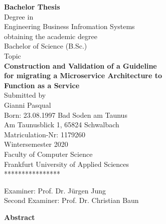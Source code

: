 \documentclass[11pt]{article}
\begin{document}
\begin{titlepage}
  \begin{center} {\LARGE \textbf{Bachelor Thesis}}\\ \vspace{1cm} Degree in\\ {\large Engineering Business Infromation Systems}\\ \vspace{1cm} obtaining the academic degree\\ \vspace{0.1cm} {\large Bachelor of Science (B.Sc.)}\\ \vspace{1.5cm} Topic\\ \vspace{0.5cm} {\LARGE \textbf{Construction and Validation of a Guideline}}\\ \vspace{0.2cm} {\LARGE \textbf{for migrating a Microservice Architecture to}}\\ \vspace{0.2cm} {\LARGE \textbf{Function as a Service}}\\ \vspace{1cm} Submitted by\\ \vspace{0.3cm} {\large Gianni Pasqual}\\ \vspace{0.5cm} Born: 23.08.1997 Bad Soden am Taunus\\ \vspace{0.1cm} Am Taunusblick 1, 65824 Schwalbach\\ \vspace{1.5cm} Matriculation-Nr: 1179260\\ \vspace{0.1cm} Wintersemester 2020 \\ \vspace{0.1cm} Faculty of Computer Science\\ \vspace{0.1cm} Frankfurt University of Applied Sciences\\ \vspace{0.5cm} **************** \vspace{2cm} \vfill \vspace{0.8cm}
  \end{center}
  {\large Examiner: Prof. Dr. Jürgen Jung}\\
  {\large Second Examiner: Prof. Dr. Christian Baun}
\end{titlepage}
\newpage
{\Large \textbf {Abstract}}
\end{document}
